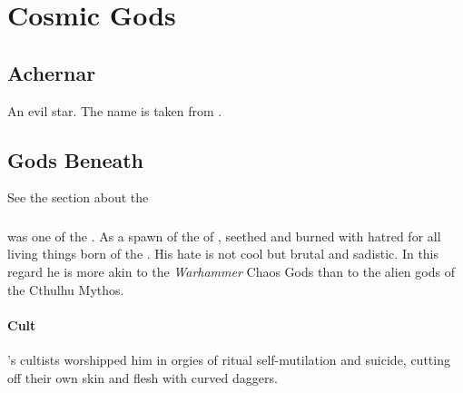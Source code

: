 \chapter{Cosmic Gods}















\section{Achernar}
An evil star. 
The name is taken from . 















\section{Gods Beneath}
See the section about the 









\subsection{\Malgaddon}
\index{\Malgaddon}
\Malgaddon was one of the .
As a spawn of the  of \Miith, \Malgaddon seethed and burned with hatred for all living things born of the . 
His hate is not cool but brutal and sadistic.
In this regard he is more akin to the \emph{Warhammer} Chaos Gods than to the alien gods of the Cthulhu Mythos.









\subsubsection{Cult}
\Malgaddon's cultists worshipped him in orgies of ritual self-mutilation and suicide, cutting off their own skin and flesh with curved daggers. 

